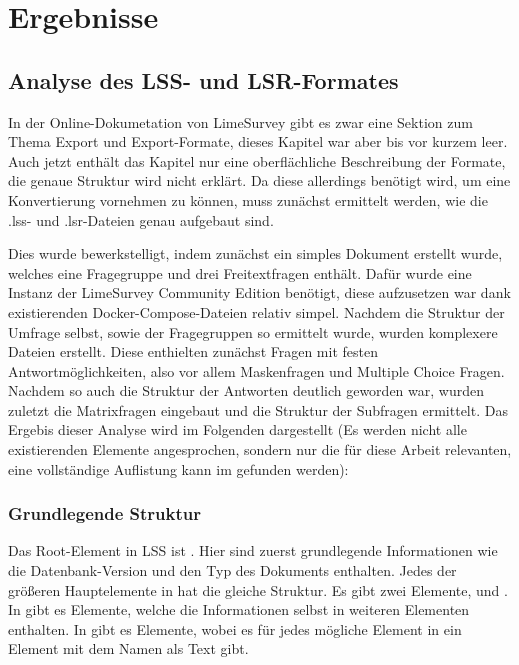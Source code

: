 \chapter{Ergebnisse}
\label{ch:ergebnisse}

\section{Analyse des LSS- und LSR-Formates}


In der Online-Dokumetation von LimeSurvey gibt es zwar eine Sektion zum Thema Export und Export-Formate, dieses Kapitel war aber bis vor kurzem leer.
Auch jetzt enthält das Kapitel nur eine oberflächliche Beschreibung der Formate, die genaue Struktur wird nicht erklärt.
Da diese allerdings benötigt wird, um eine Konvertierung vornehmen zu können, muss zunächst ermittelt werden, wie die .lss- und .lsr-Dateien genau aufgebaut sind.


Dies wurde bewerkstelligt, indem zunächst ein simples Dokument erstellt wurde, welches eine Fragegruppe und drei Freitextfragen enthält.
Dafür wurde eine Instanz der LimeSurvey Community Edition benötigt, diese aufzusetzen war dank existierenden Docker-Compose-Dateien relativ simpel.
Nachdem die Struktur der Umfrage selbst, sowie der Fragegruppen so ermittelt wurde, wurden komplexere Dateien erstellt.
Diese enthielten zunächst Fragen mit festen Antwortmöglichkeiten, also vor allem Maskenfragen und Multiple Choice Fragen.
Nachdem so auch die Struktur der Antworten deutlich geworden war, wurden zuletzt die Matrixfragen eingebaut und die Struktur der Subfragen ermittelt.
Das Ergebis dieser Analyse wird im Folgenden dargestellt (Es werden nicht alle existierenden Elemente angesprochen, sondern nur die für diese Arbeit relevanten, eine vollständige Auflistung kann im %
gefunden werden):

\subsection{Grundlegende Struktur}

Das Root-Element in LSS ist .
Hier sind zuerst grundlegende Informationen wie die Datenbank-Version und den Typ des Dokuments enthalten.
Jedes der größeren Hauptelemente in  hat die gleiche Struktur.
Es gibt zwei Elemente,  und . In  gibt es  Elemente, welche die Informationen selbst in weiteren Elementen enthalten.
In  gibt es  Elemente, wobei es für jedes mögliche Element in  ein  Element mit dem Namen als Text gibt.

